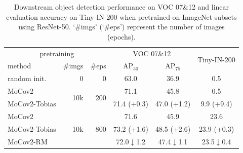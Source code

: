 \documentclass[letterpaper]{article} %
\def\pt{\phantom{0}}
\begin{document}
\begin{table}
	\caption{Downstream object detection performance on VOC 07\&12 and linear evaluation accuracy on Tiny-IN-200 when pretrained on ImageNet subsets using ResNet-50. `\#imgs' (`\#eps') represent the number of images (epochs).}
	\label{tab:small-imagenet-result}
	\centering
	\small
	\setlength{\tabcolsep}{1.2pt}
	\renewcommand{\arraystretch}{0.95}
	\renewcommand{\multirowsetup}{\centering}
	\begin{tabular}{l|r|r|c|c|c}
		\hline
		\multicolumn{3}{c|}{pretraining}          &           \multicolumn{2}{c|}{VOC 07\&12}    &\multirow{2}{*}{Tiny-IN-200}         \\
		\cline{1-5}
		method & \#imgs&\#eps & $\text{AP}_{50}$ & $\text{AP}_{75}$ &\\
		\hline
		random init.                           &0&   0&     63.0 \pt\pt\pt\pt\pt         &       36.9 \pt\pt\pt\pt\pt        & \pt0.5 \pt\pt\pt\pt\pt \\
		\hline
		MoCov2	&\multirow{2}{*}{10k} &   \multirow{2}{*}{200}  &     71.1 \pt\pt\pt\pt\pt    &  45.8 \pt\pt\pt\pt\pt     &  \pt0.5 \pt\pt\pt\pt\pt   \\
		MoCov2-Tobias&&     &          71.4 (\textcolor{grassgreen}{+0.3})    &    47.0  (\textcolor{grassgreen}{+1.2})           & \pt9.9 (\textcolor{grassgreen}{+9.4})  \\
		\cline{1-6}
		MoCov2	&\multirow{3}{*}{10k} &   \multirow{3}{*}{800}  &     71.6 \pt\pt\pt\pt\pt     &  45.9 \pt\pt\pt\pt\pt     &  23.6 \pt\pt\pt\pt\pt   \\
		MoCov2-Tobias&&     &          73.2 (\textcolor{grassgreen}{+1.6})  &    48.5  (\textcolor{grassgreen}{+2.6})           & 23.9 (\textcolor{grassgreen}{+0.3})  \\
		MoCov2-RM&&     &          72.0\pt$\downarrow$1.2\pt     &    47.4\pt$\downarrow$1.1\pt           &  23.5\pt$\downarrow$0.4\pt   \\

\end{tabular}
\end{table}
\end{document}
